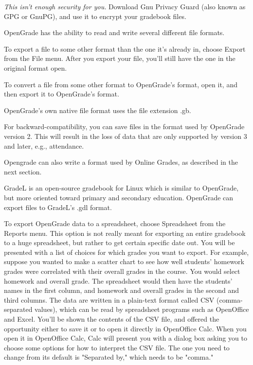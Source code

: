 \documentclass{opengrade_doc}
\begin{document}
\emph{This isn't enough security for you.\/}
Download Gnu Privacy Guard (also known as GPG or GnuPG), and use it
to encrypt your gradebook files.

\label{import-export}
OpenGrade has the ability to read and write several different file formats.

To export a file to some other format than the one it's already in, choose Export
from the File menu. After you export your file, you'll still have the one in the
original format open.

To convert a file from some other format to OpenGrade's format, open it, and then
export it to OpenGrade's format.


OpenGrade's own native file format uses the file extension .gb. 


For backward-compatibility, you can save files in the format used by OpenGrade version 2.
This will result in the loss of data that are only supported by version 3 and later, e.g., attendance.


Opengrade can also write a format used by Online Grades, as described in the next
section.


GradeL is an open-source gradebook for Linux which is similar to OpenGrade, but more
oriented toward primary and secondary education. OpenGrade can export files to
GradeL's .gdl format.


To export OpenGrade data to a spreadsheet, choose Spreadsheet from the Reports menu.
This option is not really meant for exporting an entire gradebook to a huge spreadsheet,
but rather to get certain specific date out. You will be presented with a list of
choices for which grades you want to export. For example, suppose you wanted to
make a scatter chart to see how well students' homework grades were correlated with
their overall grades in the course. You would select homework and overall grade.
The spreadsheet would then have the students' names in the first column, and homework
and overall grades in the second and third columns. The data are written in a plain-text
format called CSV (comma-separated values), which can be read by spreadsheet programs
such as OpenOffice and Excel. You'll be shown the contents of the CSV file, and offered
the opportunity either to save it or to open it directly in OpenOffice Calc. When you
open it in OpenOffice Calc, Calc will present you with a dialog box asking you to choose
some options for how to interpret the CSV file. The one you need to change from its
default is "Separated by," which needs to be "comma."
\end{document}
